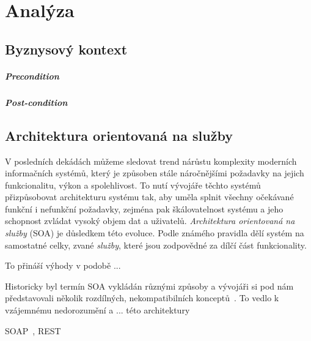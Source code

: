 \usepackage[T1]{fontenc}
\usepackage[utf8]{inputenc}


\chapter{Analýza}\label{ch:analyza}

\section{Byznysový kontext}

\paragraph{Precondition} %

\paragraph{Post-condition} %

\section{Architektura orientovaná na služby}

V posledních dekádách můžeme sledovat trend nárůstu komplexity
moderních informačních systémů, který je způsoben stále náročnějšími
požadavky na jejich funkcionalitu, výkon a spolehlivost. To nutí
vývojáře těchto systémů přizpůsobovat architekturu systému tak,
aby uměla splnit všechny očekávané funkční i nefunkční požadavky,
zejména pak škálovatelnost systému a jeho schopnost zvládat vysoký
objem dat a uživatelů. \textit{Architektura orientovaná na služby} (SOA) je
důsledkem této evoluce. Podle známého pravidla 
dělí systém na samostatné celky, zvané \textit{služby}, které jsou zodpovědné
za dílčí část funkcionality.

To přináší výhody v podobě ... %

Historicky byl termín SOA vykládán různými způsoby a vývojáři si
pod nám představovali několik rozdílných, nekompatibilních
konceptů~\cite{fowler2005serviceorientedambiguity}.
To vedlo k vzájemnému nedorozumění a ... této architektury %

SOAP~\cite{curbera2002unraveling}, REST~\cite{fielding2000rest}

